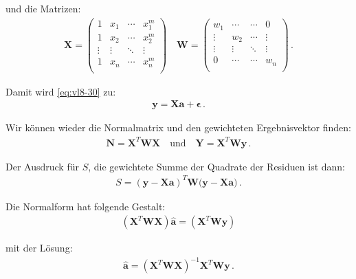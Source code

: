 und die Matrizen:
\begin{align}
\boldsymbol{X} = 
\begin{pmatrix}
1      & x_1    & \cdots & x_1^m  \\
1      & x_2    & \cdots & x_2^m  \\
\vdots & \vdots & \ddots & \vdots \\
1      & x_n    & \cdots & x_n^m  \\
\end{pmatrix}\quad
\boldsymbol{W} = 
\begin{pmatrix}
w_1    & \cdots & \cdots & 0      \\
\vdots & w_2    & \cdots & \vdots \\
\vdots & \vdots & \ddots & \vdots \\
0      & \cdots & \cdots & w_n    \\
\end{pmatrix}\,.
\label{eq:vl8-33}
\end{align}

Damit wird \cref{eq:vl8-30} zu:
\begin{align}
\boldsymbol{y} = \boldsymbol{X} \boldsymbol{a} + \boldsymbol{\epsilon}\,.
\label{eq:vl8-34}
\end{align}

Wir k\"onnen wieder die Normalmatrix und den gewichteten Ergebnisvektor finden:
\begin{align}
\boldsymbol{N} = \boldsymbol{X}^T \boldsymbol{W X} \quad \text{und} \quad \boldsymbol{Y} = \boldsymbol{X}^T \boldsymbol{W y}\,.
\label{eq:vl8-35}
\end{align}

Der Ausdruck f\"ur $S$, die gewichtete Summe der Quadrate der Residuen ist dann:
\begin{align}
S = ( \boldsymbol{y} - \boldsymbol{ X a } )^T \boldsymbol{W}( \boldsymbol{y} - \boldsymbol{X a )}\,.
\label{eq:vl8-36}
\end{align}

Die Normalform hat folgende Gestalt:
\begin{align}
( \boldsymbol{X}^T \boldsymbol{WX} ) \boldsymbol{\hat{a}} = ( \boldsymbol{X}^T \boldsymbol{Wy} )
\label{eq:vl8-37}
\end{align}

mit der L\"osung:
\begin{align}
\boldsymbol{\hat{a}} = ( \boldsymbol{X}^T \boldsymbol{WX} )^{-1} \boldsymbol{X}^T \boldsymbol{Wy}\,.
\label{eq:vl8-38}
\end{align}



